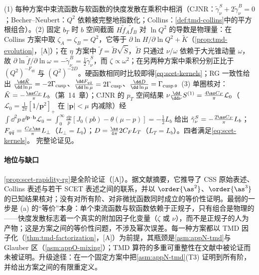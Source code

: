 \begin{proofsketch}
(1) 每种方案中束流函数与软函数的快度发散在乘积中相消（CJNR：$\tilde\gamma^S_\nu+2\tilde\gamma^B_\nu=0$\cite{ChiuEtAl2012b}；Becher--Neubert：$Q^2$ 依赖被完整地指数化\cite{BecherNeubert2011}；Collins：\cref{def:tmd-collins}中的平方根组合）。(2) 固定 $b_T$ 时 $b$ 空间截面 $H\tilde f_A\tilde f_B$ 对 $\ln Q^2$ 的导数是物理量：在 Collins 方案中取 $\zeta_A=\zeta_B=Q^2$，它等于 $\partial\ln H/\partial\ln Q^2+\tilde K$（\cref{prop:tmd-evolution}，[A]）；在 $\eta$ 方案中 $\tilde f=\tilde B\sqrt{\tilde S}$，$\tilde B$ 只通过 $\nu/\omega$ 依赖于大光锥动量 $\omega$，故 $\partial\ln\tilde f/\partial\ln\omega=-\tilde\gamma^B_\nu=\frac12\tilde\gamma^S_\nu$，而 $\zeta\propto\omega^2$；在另两种方案中乘积分别正比于 $(Q^2)^{-F_{q\bar q}}$ 与 $(Q^2)^{-2D}$。硬函数相同时比较即得\cref{eq:scet-kernels}；RG 一致性给出 $\frac{\dd\tilde K}{\dd\ln\mu}=-2\Gamma_{\rm cusp}$、$\frac{\dd F_{q\bar q}}{\dd\ln\mu}=2\Gamma_{\rm cusp}$、$\frac{\dd D}{\dd\ln\mu}=\Gamma_{\rm cusp}$。(3) 单圈核对：$\tilde K=-\frac{\as C_F}\pi L_b$（第~14~章）；CJNR 的 $p_T$ 空间结果 $\nu\frac{\dd}{\dd\nu}S^{(1)}=\frac{4\as C_F}{\pi}\mathcal L_0$（$\mathcal L_0=\frac1{2\pi}[1/\bm p^2]_+$ 在 $|\bm p|<\mu$ 内减除）\cite{ChiuEtAl2012b}经 $\int\dd^2p\,\ee^{\ii\bm p\cdot\bm b}\mathcal L_0=\int_0^\infty\frac{\dd p}p[J_0(pb)-\theta(\mu-p)]=-\frac12L_b$ 给出 $\tilde\gamma^S_\nu=-\frac{2\as C_F}{\pi}L_b$；$F_{q\bar q}=\frac{C_F\as}\pi L_\perp$（$L_\perp=L_b$）\cite{BecherNeubert2011}；$D=\frac{\as}{4\pi}2C_FL_T$（$L_T=L_b$）\cite{EchevarriaIdilbiScimemi2012}。四者满足\cref{eq:scet-kernels}。%
完整论证见\cite{Collins:2017oxh,ChiuEtAl2012b,BecherNeubert2011,EchevarriaIdilbiScimemi2012}。
\end{proofsketch}

\paragraph{地位与缺口}
\cref{prop:scet-rapidity-rg}是全阶论证（[A]）。据文献\cite{Collins:2017oxh}摘要，它推导了 CSS 原始表述、Collins 表述与若干 SCET 表述之间的联系，并以 $\order{\as^2}$、$\order{\as^3}$ 的已知结果核对；没有对所有阶、对非微扰函数同时成立的等价性证明。最弱的一步是 (a) 的“等价”本身：单个束流函数与软函数依赖于正规子，只有组合是物理的——快度发散标志着一个真实的附加因子化变量（$\zeta$ 或 $\nu$），而不是正规子的人为产物；这是方案之间的等价性问题，不涉及幂次误差。每一种方案都以 TMD 因子化（\cref{thm:tmd-factorization}，[A]）为前提，其瓶颈是\cref{asm:appN-tmd}与 Glauber 区（\cref{asm:appO-mixing}）；TMD 算符的多重可重整性在文献中被论证而未被证明\cite[第~13~章]{Collins2011}。升级途径：在一个固定方案中把\cref{asm:appN-tmd}(T3) 证明到所有阶，并给出方案之间的有限重定义。

